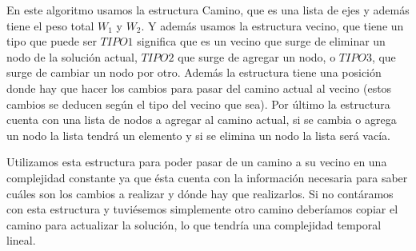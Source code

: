 En este algoritmo usamos la estructura Camino, que es una lista de ejes y además tiene el peso total $W_1$ y $W_2$. Y además usamos la estructura vecino, que tiene un tipo que puede ser $TIPO1$ significa que es un vecino que surge de eliminar un nodo de la solución actual, $TIPO2$ que surge de agregar un nodo, o $TIPO3$, que surge de cambiar un nodo por otro. Además la estructura tiene una posición donde hay que hacer los cambios para pasar del camino actual al vecino (estos cambios se deducen según el tipo del vecino que sea). Por último la estructura cuenta con una lista de nodos a agregar al camino actual, si se cambia o agrega un nodo la lista tendrá un elemento y si se elimina un nodo la lista será vacía.

Utilizamos esta estructura para poder pasar de un camino a su vecino en una complejidad constante ya que ésta cuenta con la información necesaria para saber cuáles son los cambios a realizar y dónde hay que realizarlos. Si no contáramos con esta estructura y tuviésemos simplemente otro camino deberíamos copiar el camino para actualizar la solución, lo que tendría una complejidad temporal lineal.